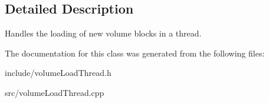\subsection{\-Detailed \-Description}
\-Handles the loading of new volume blocks in a thread. 

\-The documentation for this class was generated from the following files\-:\begin{DoxyCompactItemize}
\item 
include/volume\-Load\-Thread.\-h\item 
src/volume\-Load\-Thread.\-cpp\end{DoxyCompactItemize}
